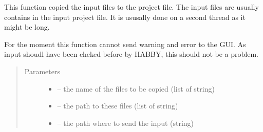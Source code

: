 \documentclass[letterpaper,10pt,english]{sphinxmanual}
\begin{document}

\begin{fulllineitems}
\label{\detokenize{index:src.load_hdf5.copy_files}}
This function copied the input files to the project file. The input files are usually contains in the input
project file. It is ususally done on a second thread as it might be long.

For the moment this function cannot send warning and error to the GUI. As input shoudl have been cheked before
by HABBY, this should not be a problem.
\begin{quote}\begin{description}
\item[{Parameters}] \leavevmode\begin{itemize}
\item {} 
 -- the name of the files to be copied (list of string)

\item {} 
 -- the path to these files (list of string)

\item {} 
 -- the path where to send the input (string)

\end{itemize}

\end{description}\end{quote}

\end{fulllineitems}

\end{document}
